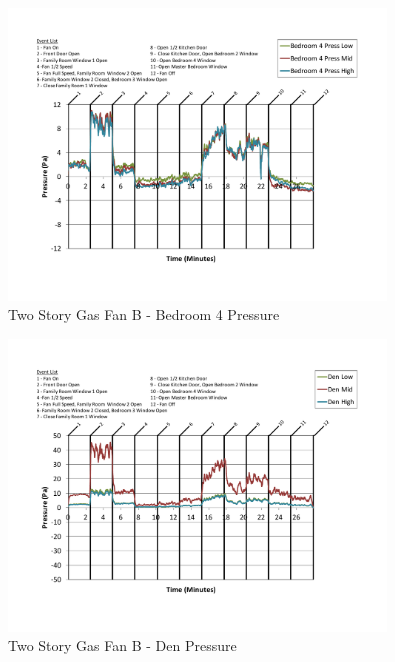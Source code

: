 \documentclass{article}
\begin{document}
\begin{appendices}
	\begin{figure}[H]
		\centering
		\includegraphics[height=3.05in,trim=0.67in 1.1in 0.67in 0.8in,clip=true]{0_Images/Results_Charts/ColdFlow/Two_Story/Gas/B/Bedroom_4_Pressure.pdf}
		\caption{Two Story Gas Fan B - Bedroom 4 Pressure}
	\end{figure}
 

	\begin{figure}[H]
		\centering
		\includegraphics[height=3.05in,trim=0.67in 1.1in 0.67in 0.8in,clip=true]{0_Images/Results_Charts/ColdFlow/Two_Story/Gas/B/Den_Pressure.pdf}
		\caption{Two Story Gas Fan B - Den Pressure}
	\end{figure}
 
	\clearpage


\end{appendices}
\end{document}
